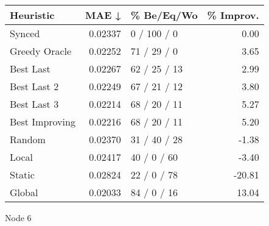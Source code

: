 \begin{tabular}{lrlr}
\toprule
\textbf{Heuristic} & \textbf{MAE ↓} & \textbf{\% Be/Eq/Wo} & \textbf{\% Improv.} \\
\midrule
            Synced &        0.02337 &          0 / 100 / 0 &                0.00 \\
     Greedy Oracle &        0.02252 &          71 / 29 / 0 &                3.65 \\
         Best Last &        0.02267 &         62 / 25 / 13 &                2.99 \\
       Best Last 2 &        0.02249 &         67 / 21 / 12 &                3.80 \\
       Best Last 3 &        0.02214 &         68 / 20 / 11 &                5.27 \\
    Best Improving &        0.02216 &         68 / 20 / 11 &                5.20 \\
            Random &        0.02370 &         31 / 40 / 28 &               -1.38 \\
             Local &        0.02417 &          40 / 0 / 60 &               -3.40 \\
            Static &        0.02824 &          22 / 0 / 78 &              -20.81 \\
            Global &        0.02033 &          84 / 0 / 16 &               13.04 \\
\bottomrule
\end{tabular}
\caption{Node 6}
\label{tab:iid_lr05_le2_bs4_6}
